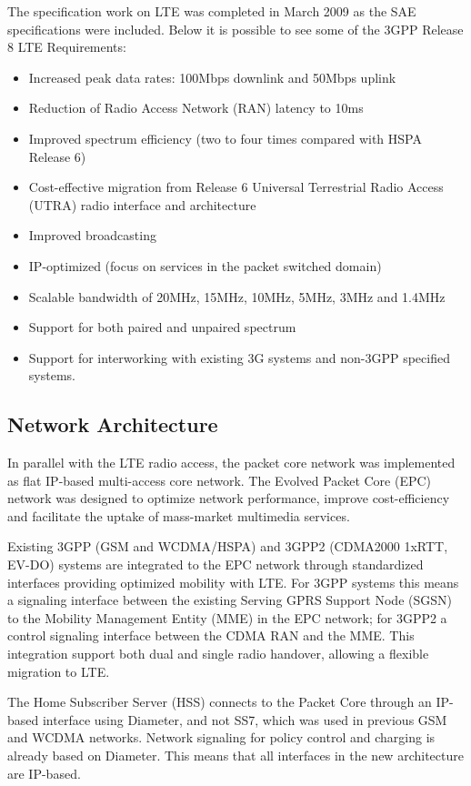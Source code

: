The specification work on LTE was completed in March 2009 as the SAE specifications
were included. Below it is possible to see some of the 3GPP Release 8 LTE Requirements:

\begin{itemize}
    \item Increased peak data rates: 100Mbps downlink and 50Mbps uplink
    \item Reduction of Radio Access Network (RAN) latency to 10ms
    \item Improved spectrum efficiency (two to four times compared with HSPA Release 6)
    \item Cost-effective migration from Release 6 Universal Terrestrial Radio
    Access (UTRA) radio interface and architecture
    \item Improved broadcasting
    \item IP-optimized (focus on services in the packet switched domain)
    \item Scalable bandwidth of 20MHz, 15MHz, 10MHz, 5MHz, 3MHz and 1.4MHz
    \item Support for both paired and unpaired spectrum
    \item Support for interworking with existing 3G systems and non-3GPP specified systems.
\end{itemize}

\subsection{Network Architecture}

In parallel with the LTE radio access, the packet core network was implemented as
flat IP-based multi-access core network. The Evolved Packet Core (EPC) network was
designed to optimize network performance, improve cost-efficiency and facilitate
the uptake of mass-market multimedia services.

Existing 3GPP (GSM and WCDMA/HSPA) and 3GPP2 (CDMA2000 1xRTT, EV-DO) systems are
integrated to the EPC network through standardized interfaces providing optimized
mobility with LTE. For 3GPP systems this means a signaling interface between the
existing Serving GPRS Support Node (SGSN) to the Mobility Management Entity (MME)
in the EPC network; for 3GPP2 a control signaling interface between the CDMA RAN
and the MME. This integration support both dual and single radio handover, allowing
a flexible migration to LTE.

The Home Subscriber Server (HSS) connects to the Packet Core through an IP-based
interface using Diameter, and not SS7, which was used in previous GSM and WCDMA
networks. Network signaling for policy control and charging is already based on
Diameter. This means that all interfaces in the new architecture are IP-based.

